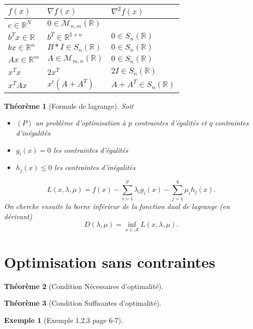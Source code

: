 \documentclass{article}
\theoremstyle{plain}%
\newtheorem{thm}{Théorème}[section]
\theoremstyle{definition}
\newtheorem{exmp}{Exemple}[section]
\begin{document}
\begin{table}[!h]
    \centering
    \begin{tabular}{|l|l|l|}
    \hline
        $ f(x) $                    & $ \nabla f(x) $                           & $ \nabla ^2 f(x) $            \\ \hline
        $ c \in \mathbb{R}^N $      & $ 0 \in \mathcal{M}_{n,m}(\mathbb{R}) $   & $ ~ $                         \\ \hline
        $ b^T x \in \mathbb{R} $    & $ b^T \in \mathbb{R}^{1 \times n} $       & $ 0 \in S_n(\mathbb{R}) $     \\ \hline
        $ bx \in \mathbb{R}^n $     & $ B*I \in S_n(\mathbb{R}) $               & $ 0 \in S_n(\mathbb{R}) $     \\ \hline
        $ Ax \in \mathbb{R}^m $     & $ A \in \mathcal{M}_{m,n}(\mathbb{R}) $   & $ 0 \in S_n(\mathbb{R}) $     \\ \hline
        $ x^Tx $                    & $ 2x^T $                                  & $ 2 I \in S_n(\mathbb{R}) $   \\ \hline
        $ x^T A x $                 & $ x^t (A + A^T) $                         & $ A+A^T \in S_n(\mathbb{R}) $ \\ \hline
    \end{tabular}
\end{table}

\begin{thm}[Formule de lagrange]
    Soit 
    \begin{itemize}
        \item $ (P) $ un problème d'optimisation à $ p $ contraintes d'égalités et $ q $ contraintes d'inégalités
        \item $ g_i (x) = 0 $ les contraintes d'égalités 
        \item $ h_j(x) \leq 0 $ les contraintes d'inégalités
    \end{itemize}
    \[
        L(x, \lambda , \mu ) = f(x) - \sum_{i=1}^{p}\lambda _i g_i(x) - \sum_{j=1}^{q}\mu _i h_j(x)
    .\]
    On cherche ensuite la borne inférieur de la fonction dual de lagrange (en dérivant)
    \[
        D(\lambda , \mu ) = \inf _{x \in \mathcal{A}} L(x, \lambda , \mu )
    .\]
\end{thm}



\section{Optimisation sans contraintes}
\begin{thm}[Condition Nécessaires d'optimalité]
    
\end{thm}

\begin{thm}[Condition Suffisantes d'optimalité]
    
\end{thm}

\begin{exmp}[Exemple 1,2,3 page 6-7]
    
\end{exmp}
\end{document}
